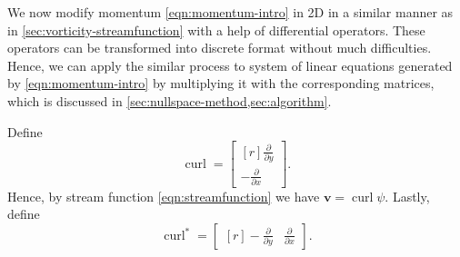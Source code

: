 \documentclass{article}
\numberwithin{equation}{section}
\begin{document}
We now modify momentum \cref{eqn:momentum-intro} in 2D in a similar manner as in \cref{sec:vorticity-streamfunction} with a help of differential operators. These operators can be transformed into discrete format without much difficulties. Hence, we can apply the similar process to system of linear equations generated by \cref{eqn:momentum-intro} by multiplying it with the corresponding matrices, which is discussed in \cref{sec:nullspace-method,sec:algorithm}. 

Define
\begin{equation}
	\operatorname{curl}
	=
	\begin{bmatrix*}[r]
	\frac{\partial}{\partial y} \\
	-\frac{\partial}{\partial x}
	\end{bmatrix*}.
\end{equation}
Hence, by stream function \cref{eqn:streamfunction} we have $\boldsymbol{v}=\operatorname{curl}\psi$. Lastly, define
\begin{equation}
	\operatorname{curl}^*
	=
	\begin{bmatrix*}[r]
	-\frac{\partial}{\partial y}&
	\frac{\partial}{\partial x}
	\end{bmatrix*}.
\end{equation}
\end{document}
